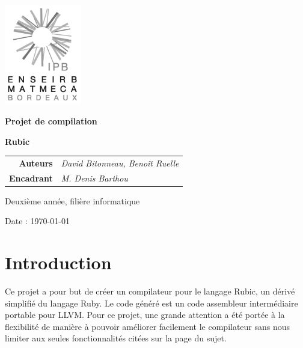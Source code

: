 \documentclass[12pt]{article}
\begin{document}
\thispagestyle{empty}
\noindent\includegraphics[width=0.25\textwidth]{enseirb-matmeca}


\begin{center}
    {\Huge\textbf{Projet de compilation}


    \textbf{Rubic}}
\end{center}


\begin{tabular}{r@{:~}l}
	\textbf{Auteurs} & \textit{David Bitonneau, Benoît Ruelle}\\
	\textbf{Encadrant} & \textit{M. Denis Barthou}\\
\end{tabular}


\begin{center}Deuxième année, filière informatique

    Date : \today
\end{center}

\newpage

\section{Introduction}

Ce projet a pour but de créer un compilateur pour le langage Rubic, un dérivé
simplifié du langage Ruby. Le code généré est un code assembleur intermédiaire
portable pour LLVM. Pour ce projet, une grande attention a été portée à la flexibilité de manière à pouvoir améliorer facilement le compilateur sans nous limiter aux seules fonctionnalités citées sur la page du sujet.
\end{document}

